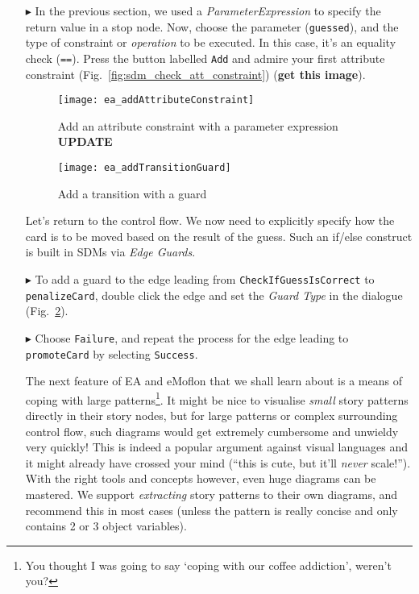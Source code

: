 \begin{itemize}
\item[$\blacktriangleright$] In the previous section, we used a \emph{ParameterExpression} to specify the return value in a stop node. Now, choose the parameter
(\texttt{guessed}), and the type of constraint or \emph{operation} to be executed. In this case, it's an equality check (\texttt{==}). Press the button labelled
\texttt{Add} and admire your first attribute constraint (Fig.~\ref{fig:sdm_check_att_constraint}) ({\bf get this image}).

\begin{figure}[htbp]
\begin{center}
  \texttt{[image: ea\_addAttributeConstraint]}
  \caption{Add an attribute constraint with a parameter expression {\bf UPDATE}}
  \label{fig:sdm_check_att_constraint }
\end{center}
\end{figure}

\begin{figure}[htbp]
\begin{center}
  \texttt{[image: ea\_addTransitionGuard]}
  \caption{Add a transition with a guard}
  \label{fig:sdm_check_guard}
\end{center}
\end{figure}

Let's return to the control flow. We now need to explicitly specify how the card is to be moved based on the result of the guess. Such an if/else construct is
built in SDMs via \emph{Edge Guards}.

\item[$\blacktriangleright$] To add a guard to the edge leading from \texttt{Check\-If\-Guess\-Is\-Correct} to \texttt{penalize\-Card}, double click the edge
and set the \emph{Guard Type} in the dialogue (Fig.~\ref{fig:sdm_check_guard}).

\item[$\blacktriangleright$] Choose \texttt{Failure}, and repeat the process for the edge leading to \texttt{promoteCard} by selecting \texttt{Success}.

The next feature of EA and eMoflon that we shall learn about is a means of coping with large patterns\footnote{You thought I was going to say `coping with our
coffee addiction', weren't you?}. It might be nice to visualise \emph{small} story patterns directly in their story nodes, but for large patterns or complex
surrounding control flow, such diagrams would get extremely cumbersome and unwieldy very quickly!  This is indeed a popular argument against visual languages and
it might already have crossed your mind (``this is cute, but it'll \emph{never} scale!''). With the right tools and concepts however, even huge diagrams can be
mastered. We support \emph{extracting} story patterns to their own diagrams, and recommend this in most cases (unless the pattern is really concise and only
contains 2 or 3 object variables).


\end{itemize}
